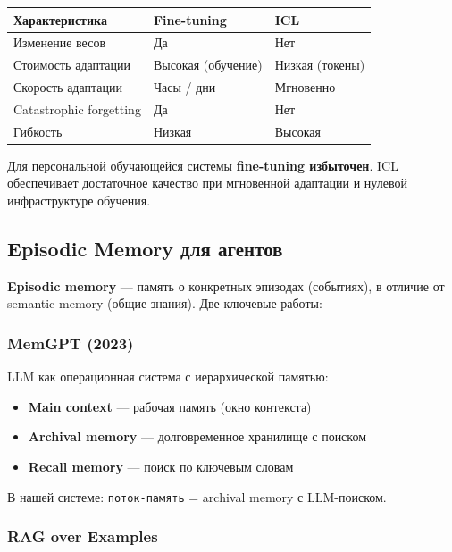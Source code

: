 \documentclass[12pt, a4paper, twoside]{article}
\begin{document}
\begin{center}
\begin{tabularx}{0.9\textwidth}{lLL}
  \toprule
  \textbf{Характеристика} & \textbf{Fine-tuning} & \textbf{ICL} \\
  \midrule
  Изменение весов & Да & Нет \\
  Стоимость адаптации & Высокая (обучение) & Низкая (токены) \\
  Скорость адаптации & Часы / дни & Мгновенно \\
  Catastrophic forgetting & Да & Нет \\
  Гибкость & Низкая & Высокая \\
  \bottomrule
\end{tabularx}
\end{center}

\begin{infobox}[title={Вывод}]
Для персональной обучающейся системы \textbf{fine-tuning избыточен}.
ICL обеспечивает достаточное качество при мгновенной адаптации
и нулевой инфраструктуре обучения.
\end{infobox}

\subsection{Episodic Memory для агентов}

\textbf{Episodic memory} --- память о конкретных эпизодах (событиях),
в отличие от semantic memory (общие знания). Две ключевые работы:

\subsubsection{MemGPT (2023)}

LLM как операционная система с иерархической памятью:
\begin{itemize}[leftmargin=1.5em]
  \item \textbf{Main context} --- рабочая память (окно контекста)
  \item \textbf{Archival memory} --- долговременное хранилище с поиском
  \item \textbf{Recall memory} --- поиск по ключевым словам
\end{itemize}

В нашей системе: \texttt{поток-память} = archival memory с LLM-поиском.

\subsubsection{RAG over Examples}
\end{document}
